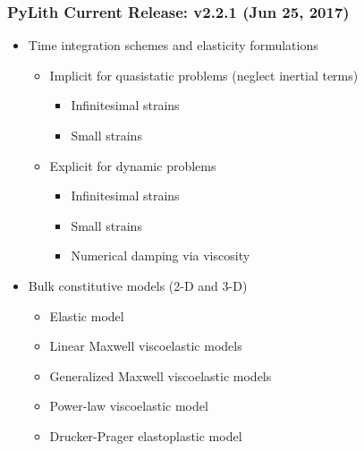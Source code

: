 \documentclass[aspectratio=169]{beamer}
\begin{document}
\begin{frame}
  \frametitle{PyLith Current Release: v2.2.1 (Jun 25, 2017)}

  \begin{itemize}
  \item Time integration schemes and elasticity formulations
    \begin{itemize}
    \item Implicit for quasistatic problems (neglect inertial terms)
      \begin{itemize}
      \item Infinitesimal strains
      \item Small strains
      \end{itemize}
    \item Explicit for dynamic problems
      \begin{itemize}
      \item Infinitesimal strains
      \item Small strains
      \item Numerical damping via viscosity
     \end{itemize}
    \end{itemize}
  \item Bulk constitutive models (2-D and 3-D)
    \begin{itemize}
    \item Elastic model 
    \item Linear Maxwell viscoelastic models
    \item Generalized Maxwell viscoelastic models
    \item Power-law viscoelastic model
    \item Drucker-Prager elastoplastic model
    \end{itemize}
 \end{itemize}

\end{frame}
\end{document}
